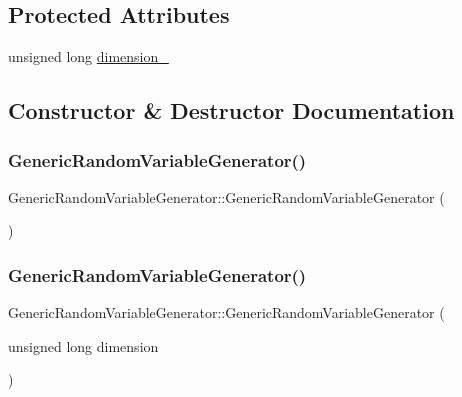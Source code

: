 \subsection*{Protected Attributes}
\begin{DoxyCompactItemize}
\item 
unsigned long \hyperlink{class_generic_random_variable_generator_aec0118677502f71bbb4ad07c6b8e95be}{dimension\+\_\+}
\end{DoxyCompactItemize}


\subsection{Constructor \& Destructor Documentation}
\hypertarget{class_generic_random_variable_generator_a4e113dd8b32eb72dc0719b677a938358}{}\label{class_generic_random_variable_generator_a4e113dd8b32eb72dc0719b677a938358} 
\subsubsection{\texorpdfstring{Generic\+Random\+Variable\+Generator()}{GenericRandomVariableGenerator()}\hspace{0.1cm}{\footnotesize\ttfamily [1/2]}}
{\footnotesize\ttfamily Generic\+Random\+Variable\+Generator\+::\+Generic\+Random\+Variable\+Generator (\begin{DoxyParamCaption}{ }\end{DoxyParamCaption})\hspace{0.3cm}{\ttfamily [inline]}}

\hypertarget{class_generic_random_variable_generator_a331a9e178a7f44349e03a6ed21b940e0}{}\label{class_generic_random_variable_generator_a331a9e178a7f44349e03a6ed21b940e0} 
\subsubsection{\texorpdfstring{Generic\+Random\+Variable\+Generator()}{GenericRandomVariableGenerator()}\hspace{0.1cm}{\footnotesize\ttfamily [2/2]}}
{\footnotesize\ttfamily Generic\+Random\+Variable\+Generator\+::\+Generic\+Random\+Variable\+Generator (\begin{DoxyParamCaption}\item[{unsigned long}]{dimension }\end{DoxyParamCaption})\hspace{0.3cm}{\ttfamily [inline]}}

